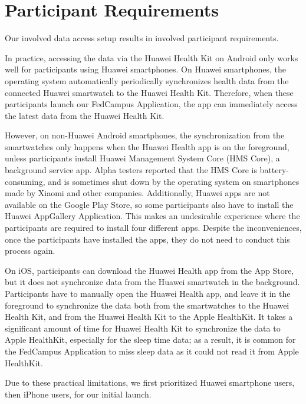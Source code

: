 \section{Participant Requirements}

Our involved data access setup results in involved participant requirements.

In practice, accessing the data via the Huawei Health Kit on Android only works
well for participants using Huawei smartphones.
On Huawei smartphones,
the operating system automatically periodically synchronizes health data from
the connected Huawei smartwatch to the Huawei Health Kit.
Therefore, when these participants launch our FedCampus Application,
the app can immediately access the latest data from the Huawei Health Kit.

However, on non-Huawei Android smartphones,
the synchronization from the smartwatches only happens when
the Huawei Health app is on the foreground,
unless participants install Huawei Management System Core (HMS Core),
a background service app.
Alpha testers reported that the HMS Core is battery-consuming,
and is sometimes shut down by the operating system on smartphones made by
Xiaomi and other companies.
Additionally, Huawei apps are not available on the Google Play Store,
so some participants also have to install the Huawei AppGallery Application.
This makes an undesirable experience where the participants are required to
install four different apps.
Despite the inconveniences, once the participants have installed the apps,
they do not need to conduct this process again.

On iOS, participants can download the Huawei Health app from the App Store,
but it does not synchronize data from the Huawei smartwatch in the background.
Participants have to manually open the Huawei Health app,
and leave it in the foreground to synchronize the data both from
the smartwatches to the Huawei Health Kit,
and from the Huawei Health Kit to the Apple HealthKit.
It takes a significant amount of time for Huawei Health Kit to
synchronize the data to Apple HealthKit,
especially for the sleep time data;
as a result, it is common for the FedCampus Application to miss sleep data as
it could not read it from Apple HealthKit.

Due to these practical limitations,
we first prioritized Huawei smartphone users, then iPhone users,
for our initial launch.
